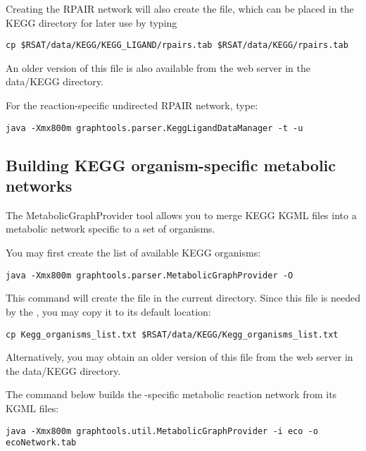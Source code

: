 Creating the RPAIR network will also create the  file, which
can be placed in the KEGG directory for later use by typing

\begin{lstlisting}
cp $RSAT/data/KEGG/KEGG_LIGAND/rpairs.tab $RSAT/data/KEGG/rpairs.tab
\end{lstlisting}

An older version of this file is also available from the \neat web server
in the data/KEGG directory.

For the reaction-specific undirected RPAIR network, type:

\begin{verbatim}
java -Xmx800m graphtools.parser.KeggLigandDataManager -t -u
\end{verbatim}

\subsection{Building KEGG organism-specific metabolic networks}

The MetabolicGraphProvider tool allows you to merge KEGG KGML files into
a metabolic network specific to a set of organisms. 

You may first create the list of available KEGG organisms:

\begin{verbatim}
java -Xmx800m graphtools.parser.MetabolicGraphProvider -O
\end{verbatim}

This command will create the file  in the
current directory. Since this file is needed by the
, you may copy it to its default location:

\begin{lstlisting}
cp Kegg_organisms_list.txt $RSAT/data/KEGG/Kegg_organisms_list.txt
\end{lstlisting}

Alternatively, you may obtain an older version of this file from the \neat web
server in the data/KEGG directory. 


The command below builds the -specific metabolic reaction network
from its KGML files:

\begin{verbatim}
java -Xmx800m graphtools.util.MetabolicGraphProvider -i eco -o ecoNetwork.tab
\end{verbatim}

